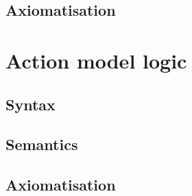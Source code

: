 \subsection{Axiomatisation}

\section{Action model logic}

\subsection{Syntax}

\subsection{Semantics}

\subsection{Axiomatisation}
